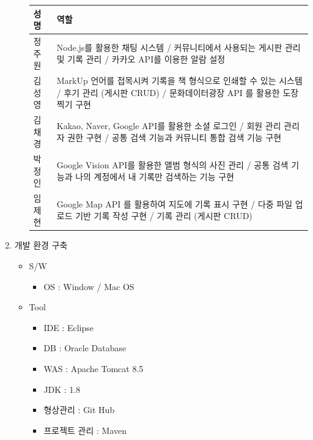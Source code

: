 \begin{enumerate}
\begin{itemize}
            \begin{tabular}{ |p{2cm}|p{12cm}| }
                \hline
                \textbf{성 명} & \textbf{역할} \\
                \hline
                정주원 & Node.js를 활용한 채팅 시스템 / 커뮤니티에서 사용되는 게시판 관리 및 기록 관리 / 카카오 API를 이용한 알람 설정\\
                \hline
                김성영 & MarkUp 언어를 접목시켜 기록을 책 형식으로 인쇄할 수 있는 시스템 / 후기 관리 (게시판 CRUD) / 문화데이터광장 API 를 활용한 도장찍기 구현 \\
                \hline
                김채경 & Kakao, Naver, Google API를 활용한 소셜 로그인 / 회원 관리 관리자 권한 구현 / 공통 검색 기능과 커뮤니티 통합 검색 기능 구현 \\
                \hline
                박정인 & Google Vision API를 활용한 앨범 형식의 사진 관리 / 공통 검색 기능과 나의 계정에서 내 기록만 검색하는 기능 구현 \\
                \hline
                임제현 & Google Map API 를 활용하여 지도에 기록 표시 구현 / 다중 파일 업로드 기반 기록 작성 구현 / 기록 관리 (게시판 CRUD) \\
                \hline
            \end{tabular}

        \end{itemize}
    \newpage
    \item 개발 환경 구축
    \begin{itemize}
        \item S/W 
            \begin{itemize}
                \item[] OS : Window / Mac OS
            \end{itemize}
        \item Tool
        \begin{itemize}
            \item[] IDE : Eclipse
            \item[] DB : Oracle Database
            \item[] WAS : Apache Tomcat 8.5
            \item[] JDK : 1.8
            \item[] 형상관리 : Git Hub
            \item[] 프로젝트 관리 : Maven 
        \end{itemize}
    \end{itemize}

\end{enumerate}
\par\

